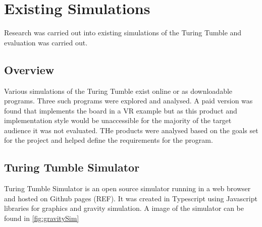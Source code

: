 \documentclass{l4proj}
\begin{document}
\section{Existing Simulations}
Research was carried out into existing simulations of the Turing Tumble and evaluation was carried out.

\subsection{Overview}
Various simulations of the Turing Tumble exist online or as downloadable programs. Three such programs were explored and analysed. A paid version was found that implements the board in a VR example but as this product and implementation style would be unaccessible for the majority of the target audience it was not evaluated. THe products were analysed based on the goals set for the project and helped define the requirements for the program.

\subsection{Turing Tumble Simulator}
Turing Tumble Simulator is an open source simulator running in a web browser and hosted on Github pages (REF). It was created in Typescript using Javascript libraries for graphics and gravity simulation. A image of the simulator can be found in \ref{fig:gravitySim}
\end{document}
